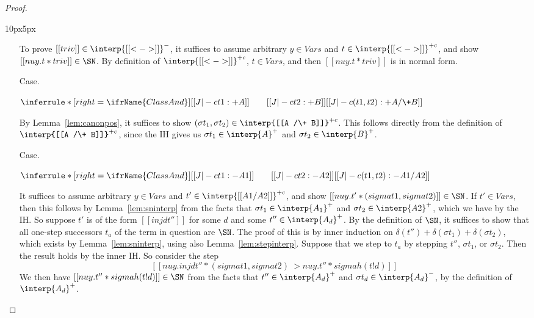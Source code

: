 \begin{proof}
\begin{changemargin}{10px}{5px}
\begin{itemize}
To prove $[[triv]]\in\interp{[[<->]]}^{-}$, it suffices to assume
arbitrary $y\in\textit{Vars}$ and $t\in\interp{[[<->]]}^{+c}$, and
show $[[nu y . t * triv]]\in\SN$.  By definition of
$\interp{[[<->]]}^{+c}$, $t\in\textit{Vars}$, and then $[[nu y . t *
triv]]$ is in normal form.

\item[Case.]\ 

\vspace{-.2cm}
\begin{center}
\begin{math}
\inferrule* [right=\ifrName{ClassAnd}] {[[J |-c t1 : + A]] \qquad [[J |-c t2 : + B]]}{[[J |-c (t1,t2) : + A /\+ B]]}
\end{math}
\end{center}

By Lemma~\ref{lem:canonpos}, it suffices to show $(\sigma t_1,\sigma
t_2)\in\interp{[[A /\+ B]]}^{+c}$.  This follows directly from the
definition of $\interp{[[A /\+ B]]}^{+c}$, since the IH gives us
$\sigma t_1\in\interp{A}^+$ and $\sigma t_2\in\interp{B}^+$.

\item[Case.]\ 

\vspace{-.2cm}
\begin{center}
\begin{math}
\inferrule* [right=\ifrName{ClassAnd}] {[[J |-c t1 : - A1]] \qquad [[J |-c t2 : - A2]]}{[[J |-c (t1,t2) : - A1 /\- A2]]}
\end{math}
\end{center}

It suffices to assume arbitrary $y\in\textit{Vars}$ and
$t'\in\interp{[[A1 /\- A2]]}^{+c}$, and show $[[nu y . t' * (sigma t1
, sigma t2)]]\in\SN$.  If $t'\in\textit{Vars}$, then this follows by
Lemma~\ref{lem:sninterp} from the facts that $\sigma
t_1\in\interp{A_1}^+$ and $\sigma t_2\in\interp{A2}^+$, which we have
by the IH.  So suppose $t'$ is of the form $[[inj d t'']]$ for some
$d$ and some $t''\in\interp{A_d}^+$.  By the definition of $\SN$, it
suffices to show that all one-step successors $t_a$ of the term in
question are $\SN$.  The proof of this is by inner induction on
$\delta(t'') + \delta(\sigma t_1) + \delta(\sigma t_2)$, which exists
by Lemma~\ref{lem:sninterp}, using also Lemma~\ref{lem:stepinterp}.
Suppose that we step to $t_a$ by stepping $t''$, $\sigma t_1$, or
$\sigma t_2$.  Then the result holds by the inner IH.  So consider the
step
\[
[[nu y . inj d t'' * (sigma t1, sigma t2) ~> nu y . t'' * sigma h(t ! d)]]
\]
We then have $[[nu y . t'' * sigma h(t ! d)]]\in\SN$ from the facts
that $t''\in\interp{A_d}^+$ and $\sigma t_d\in\interp{A_d}^-$, by
the definition of $\interp{A_d}^+$.


\end{itemize}
\end{changemargin}
\end{proof}
